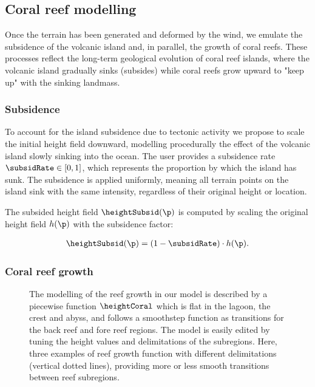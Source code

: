 \subsection{Coral reef modelling}
\label{sec:coral-island-coral-reef}

Once the terrain has been generated and deformed by the wind, we emulate the subsidence of the volcanic island and, in parallel, the growth of coral reefs. These processes reflect the long-term geological evolution of coral reef islands, where the volcanic island gradually sinks (subsides) while coral reefs grow upward to "keep up" with the sinking landmass.

\subsubsection{Subsidence}
\label{sec:coral-island-subsidence}

To account for the island subsidence due to tectonic activity we propose to scale the initial height field downward, modelling procedurally the effect of the volcanic island slowly sinking into the ocean. The user provides a subsidence rate $\subsidRate \in [0, 1]$, which represents the proportion by which the island has sunk. The subsidence is applied uniformly, meaning all terrain points on the island sink with the same intensity, regardless of their original height or location.

The subsided height field $\heightSubsid(\p)$ is computed by scaling the original height field $h(\p)$ with the subsidence factor:

\begin{align*}
    \heightSubsid(\p) = (1 - \subsidRate) \cdot h(\p).
\end{align*}


\subsubsection{Coral reef growth}
\label{sec:coral-island-reef-growth}

\begin{figure}
    \caption[Coral reef growth from analytical model]{The modelling of the reef growth in our model is described by a piecewise function $\heightCoral$ which is flat in the lagoon, the crest and abyss, and follows a smoothstep function as transitions for the back reef and fore reef regions. The model is easily edited by tuning the height values and delimitations of the subregions. Here, three examples of reef growth function with different delimitations (vertical dotted lines), providing more or less smooth transitions between reef subregions.}
    \label{fig:coral-island-reef-function}
\end{figure}

